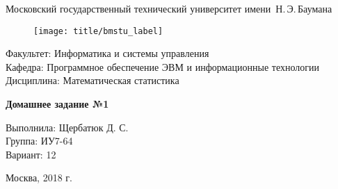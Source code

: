 
\thispagestyle{empty}

\begin{center}
    \Large
    Московский государственный технический университет имени~Н.\,Э.\,Баумана
\end{center}

\begin{figure}[h!]
    \begin{center}
        \texttt{[image: title/bmstu\_label]}
    \end{center}
\end{figure}

{\large
\noindent
Факультет: Информатика и системы управления\\[2mm]
\noindent
Кафедра: Программное обеспечение ЭВМ и информационные технологии\\[2mm]
\noindent
Дисциплина: Математическая статистика
\vspace{1.5cm}}

\begin{center}
    \Large
    \textbf{Домашнее задание №1} \\
\end{center}
\vfill

\hfill\begin{minipage}{0.35\textwidth}
    Выполнила: Щербатюк Д. С.\\
    Группа: ИУ7-64\\
    Вариант: 12
\end{minipage}
\vfill

\begin{center}
    Москва, 2018 г.
\end{center}